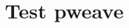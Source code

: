\documentclass[a4paper,bahasa]{extbook}
\begin{document}



\chapter{Test pweave}



\end{document}
